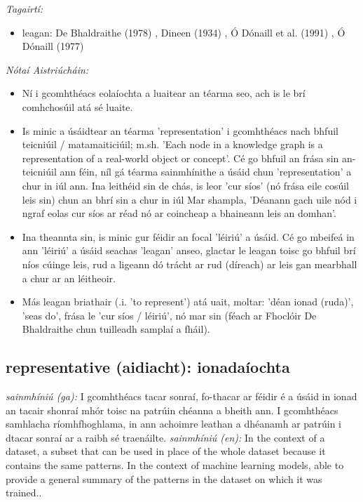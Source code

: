 \documentclass{article}
\begin{document}
 \noindent \textit{Tagairtí:}
\begin{itemize}
	\item leagan: De Bhaldraithe (1978) \cite{de-bhaldraithe}, Dineen (1934) \cite{dineen}, Ó Dónaill et al. (1991) \cite{focloir-beag}, Ó Dónaill (1977) \cite{odonaill}
\end{itemize}

 \noindent \textit{Nótaí Aistriúcháin:}
\begin{itemize}
	\item Ní i gcomhthéacs eolaíochta a luaitear an téarma seo, ach is le brí comhchosúil atá sé luaite.
	\item Is minic a úsáidtear an téarma 'representation' i gcomhthéacs nach bhfuil teicniúil / matamaiticiúil; m.sh. 'Each node in a knowledge graph is a representation of a real-world object or concept'. Cé go bhfuil an frása sin an-teicniúil ann féin, níl gá téarma sainmhínithe a úsáid chun 'representation' a chur in iúl ann. Ina leithéid sin de chás, is leor 'cur síos' (nó frása eile cosúil leis sin) chun an bhrí sin a chur in iúl Mar shampla, 'Déanann gach uile nód i ngraf eolas cur síos ar réad nó ar coincheap a bhaineann leis an domhan'.
	\item Ina theannta sin, is minic gur féidir an focal 'léiriú' a úsáid. Cé go mbeifeá in ann 'léiriú' a úsáid seachas 'leagan' anseo, glactar le leagan toisc go bhfuil brí níos cúinge leis, rud a ligeann dó trácht ar rud (díreach) ar leis gan mearbhall a chur ar an léitheoir.
	\item Más leagan briathair (.i. 'to represent') atá uait, moltar: 'déan ionad (ruda)', 'seas do', frása le 'cur síos / léiriú', nó mar sin (féach ar Fhoclóir De Bhaldraithe chun tuilleadh samplaí a fháil).
\end{itemize}


\subsection*{representative (aidiacht): ionadaíochta} 
 \noindent \textit{sainmhíniú (ga):} I gcomhthéacs tacar sonraí, fo-thacar ar féidir é a úsáid in ionad an tacair shonraí mhór toisc na patrúin chéanna a bheith ann. I gcomhthéacs samhlacha ríomhfhoghlama, in ann achoimre leathan a dhéanamh ar patrúin i dtacar sonraí ar a raibh sé traenáilte.
\newline\newline
 \noindent \textit{sainmhíniú (en):} In the context of a dataset, a subset that can be used in place of the whole dataset because it contains the same patterns. In the context of machine learning models, able to provide a general summary of the patterns in the dataset on which it was trained..
\newline
\end{document}
